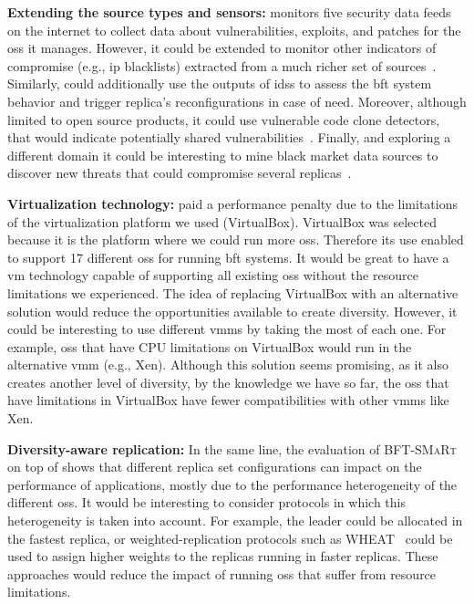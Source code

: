 \textbf{Extending the \system source types and sensors:}
\system monitors five security data feeds on the internet to collect data about vulnerabilities, exploits, and patches for the \glspl{os} it manages.
However, it could be extended to monitor other indicators of compromise (e.g., \gls{ip} blacklists) extracted from a much richer set of sources~\cite{Liao:2016,Sabottke:2015}.
Similarly, \system could additionally use the outputs of \glspl{ids} to assess the \gls{bft} system behavior and trigger replica's reconfigurations in case of need.
Moreover, although limited to open source products, it could use vulnerable code clone detectors, that would indicate potentially shared vulnerabilities~\cite{Kim:2017,Xu:2017}.
Finally, and exploring a different domain it could be interesting to mine black market data sources to discover new threats that could compromise several replicas~\cite{Allodi:2014}.


\textbf{Virtualization technology:}
\system paid a performance penalty due to the limitations of the virtualization platform we used (VirtualBox).
VirtualBox was selected because it is the platform where we could run more \glspl{os}.
Therefore its use enabled \system to support 17 different \glspl{os} for running \gls{bft} systems.
It would be great to have a \gls{vm} technology capable of supporting all existing \glspl{os} without the resource limitations we experienced.
The idea of replacing VirtualBox with an alternative solution would reduce the opportunities available to create diversity.
However, it could be interesting to use different \glspl{vmm} by taking the most of each one. 
For example, \glspl{os} that have CPU limitations on VirtualBox would run in the alternative \gls{vmm} (e.g., Xen).
Although this solution seems promising, as it also creates another level of diversity, by the knowledge we have so far, the \glspl{os} that have limitations in VirtualBox have fewer compatibilities with other \glspl{vmm} like Xen.

\textbf{Diversity-aware replication:}
In the same line, the evaluation of \textsc{BFT-SMaRt} on top of \system shows that different replica set configurations can impact on the performance of applications, mostly due to the performance heterogeneity of the different \glspl{os}.
It would be interesting to consider protocols in which this heterogeneity is taken into account.
For example, the leader could be allocated in the fastest replica, or weighted-replication protocols such as WHEAT~\cite{Sousa:2015} could be used to assign higher weights to the replicas running in faster replicas.
These approaches would reduce the impact of running \glspl{os} that suffer from resource limitations.



